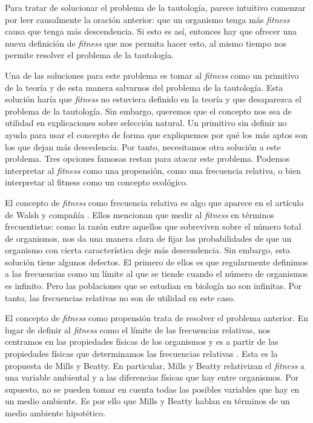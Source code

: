 Para tratar de solucionar el problema de la tautología, parece intuitivo comenzar por leer causalmente la oración anterior: que un organismo tenga más \emph{fitness} causa que tenga más descendencia. Si esto es así, entonces hay que ofrecer una nueva definición de \emph{fitness} que nos permita hacer esto, al mismo tiempo nos permite resolver el problema de la tautología.

Una de las soluciones para este problema es tomar al \emph{fitness} como un primitivo de la teoría y de esta manera salvarnos del problema de la tautología. Esta solución haría que \emph{fitness} no estuviera definido en la teoría y que desaparezca el problema de la tautología. Sin embargo, queremos que el concepto nos sea de utilidad en explicaciones sobre selección natural. Un primitivo sin definir no ayuda para usar el concepto de forma que expliquemos por qué los más aptos son los que dejan más descedencia. Por tanto, necesitamos otra solución a este problema. Tres opciones famosas restan para atacar este problema. Podemos interpretar al \emph{fitness} como una propensión, como una frecuencia relativa, o bien interpretar al fitness como un concepto ecológico.

El concepto de \emph{fitness} como frecuencia relativa es algo que aparece en el artículo de Walsh y compañía \citeyear{Walsh2002}. Ellos mencionan que medir al \emph{fitness} en términos frecuentistas: como la razón entre aquellos que sobreviven sobre el número total de organismos, nos da una manera clara de fijar las probabilidades de que un organismo con cierta característica deje más descendencia. Sin embargo, esta solución tiene algunos defectos. El primero de ellos es que regularmente definimos a las frecuencias como un límite al que se tiende cuando el número de organismos es infinito. Pero las poblaciones que se estudian en biología no son infinitas. Por tanto, las frecuencias relativas no son de utilidad en este caso.

El concepto de \emph{fitness} como propensión trata de resolver el problema anterior. En lugar de definir al \emph{fitness} como el límite de las frecuencias relativas, nos centramos en las propiedades físicas de los organismos y es a partir de las propiedades físicas que determinamos las frecuencias relativas \cite{Mills1979}. Esta es la propuesta de Mills y Beatty. En particular, Mills y Beatty relativizan el \emph{fitness} a una variable ambiental y a las diferencias físicas que hay entre organismos. Por supuesto, no se pueden tomar en cuenta todas las posibles variables que hay en un medio ambiente. Es por ello que Mills y Beatty hablan en términos de un medio ambiente hipotético.

